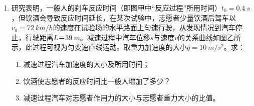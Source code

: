 \begin{enumerate}[leftmargin=0em]
{\begin{enumerate}
\end{enumerate}


}


\newpage
\item 
{}
研究表明，一般人的刹车反应时间（即图甲中“反应过程”所用时间）$ t_{0}=0.4\ s $，但饮酒会导致反应时间延长，在某次试验中，志愿者少量饮酒后驾车以$ v_0=72 \ km/h $的速度在试验场的水平路面上匀速行驶，从发现情况到汽车停止，行驶距离$ L＝39 \ m $。减速过程中汽车位移$ s $与速度$ v $的关系曲线如图乙所示，此过程可视为匀变速直线运动。取重力加速度的大小$ g=10 \ m/s^{2} $。求：
\begin{enumerate}
\renewcommand{\labelenumi}{\arabic{enumi}.}
\item
减速过程汽车加速度的大小及所用时间；
\item 
饮酒使志愿者的反应时间比一般人增加了多少？
\item 
减速过程汽车对志愿者作用力的大小与志愿者重力大小的比值。

\end{enumerate}
\begin{figure}[h!]
\flushright

\end{figure}






\end{enumerate}
